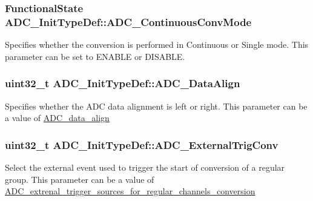 \subsubsection[{A\+D\+C\+\_\+\+Continuous\+Conv\+Mode}]{\setlength{\rightskip}{0pt plus 5cm}Functional\+State A\+D\+C\+\_\+\+Init\+Type\+Def\+::\+A\+D\+C\+\_\+\+Continuous\+Conv\+Mode}\label{struct_a_d_c___init_type_def_a2149036a332281e70a36879a2396b8d1}
Specifies whether the conversion is performed in Continuous or Single mode. This parameter can be set to E\+N\+A\+B\+L\+E or D\+I\+S\+A\+B\+L\+E. \hypertarget{struct_a_d_c___init_type_def_a622e89d8fba3900f20aaf40d5560ab7b}{}
\subsubsection[{A\+D\+C\+\_\+\+Data\+Align}]{\setlength{\rightskip}{0pt plus 5cm}uint32\+\_\+t A\+D\+C\+\_\+\+Init\+Type\+Def\+::\+A\+D\+C\+\_\+\+Data\+Align}\label{struct_a_d_c___init_type_def_a622e89d8fba3900f20aaf40d5560ab7b}
Specifies whether the A\+D\+C data alignment is left or right. This parameter can be a value of \hyperlink{group___a_d_c__data__align}{A\+D\+C\+\_\+data\+\_\+align} \hypertarget{struct_a_d_c___init_type_def_ae5d0c48e70c2a39355b7ab0cc1df8310}{}
\subsubsection[{A\+D\+C\+\_\+\+External\+Trig\+Conv}]{\setlength{\rightskip}{0pt plus 5cm}uint32\+\_\+t A\+D\+C\+\_\+\+Init\+Type\+Def\+::\+A\+D\+C\+\_\+\+External\+Trig\+Conv}\label{struct_a_d_c___init_type_def_ae5d0c48e70c2a39355b7ab0cc1df8310}
Select the external event used to trigger the start of conversion of a regular group. This parameter can be a value of \hyperlink{group___a_d_c__extrenal__trigger__sources__for__regular__channels__conversion}{A\+D\+C\+\_\+extrenal\+\_\+trigger\+\_\+sources\+\_\+for\+\_\+regular\+\_\+channels\+\_\+conversion} \hypertarget{struct_a_d_c___init_type_def_abe372c73942aef47016be85ca1b79650}{}
